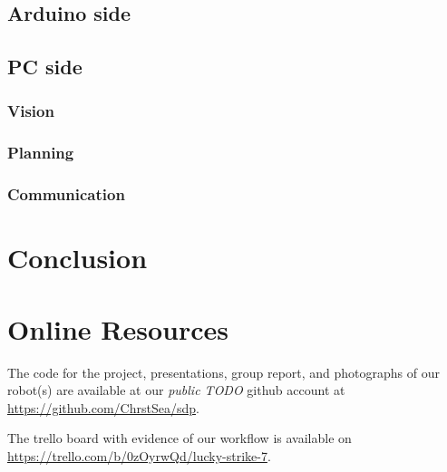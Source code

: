 \documentclass[12pt,a4paper]{article}
\begin{document}
\subsection{Arduino side}

\subsection{PC side}
\subsubsection{Vision}
\subsubsection{Planning}
\subsubsection{Communication}

\section{Conclusion}

\section{Online Resources}
The code for the project, presentations, group report, and photographs of our robot(s) are available at our \textit{public TODO} github account at \url{https://github.com/ChrstSea/sdp}.

The trello board with evidence of our workflow is available on \url{https://trello.com/b/0zOyrwQd/lucky-strike-7}.
\end{document}
